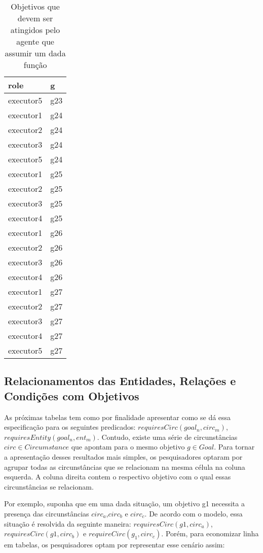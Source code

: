 \begin{table}[H]
\centering
{}
\begin{tabular}{|l|l|}
\hline
\textbf{role} & \textbf{g} \\ \hline
executor5 & g23 \\ \hline
executor1 & g24 \\ \hline
executor2 & g24 \\ \hline
executor3 & g24 \\ \hline
executor5 & g24 \\ \hline
executor1 & g25 \\ \hline
executor2 & g25 \\ \hline
executor3 & g25 \\ \hline
executor4 & g25 \\ \hline
executor1 & g26 \\ \hline
executor2 & g26 \\ \hline
executor3 & g26 \\ \hline
executor4 & g26 \\ \hline
executor1 & g27 \\ \hline
executor2 & g27 \\ \hline
executor3 & g27 \\ \hline
executor4 & g27 \\ \hline
executor5 & g27 \\ \hline
\end{tabular}
\caption{Objetivos que devem ser atingidos pelo agente que assumir um dada função}
\label{deontic4}
\end{table}

\subsection{Relacionamentos das Entidades, Relações e Condições com Objetivos}

As próximas tabelas tem como por finalidade apresentar como se dá essa especificação para os seguintes predicados: $requiresCirc(goal_n, circ_m)$,$requiresEntity(goal_n, ent_m)$. Contudo, existe uma série de circunstâncias $circ \in Circumstance$ que apontam para o mesmo objetivo $g \in Goal$. Para tornar a apresentação desses resultados mais simples, os pesquisadores optaram por agrupar todas as circunstâncias que se relacionam na mesma célula na coluna esquerda. A coluna direita contem o respectivo objetivo com o qual essas circunstâncias se relacionam.

Por exemplo, suponha que em uma dada situação, um objetivo g1 necessita a presença das circunstâncias $circ_a$,$circ_b$ e $circ_c$. De acordo com o modelo, essa situação é resolvida da seguinte maneira: $requiresCirc(g1,circ_a)$, $requiresCirc(g1,circ_b)$ e $requireCirc(g_1,circ_c)$. Porém, para economizar linha em tabelas, os pesquisadores optam por representar esse cenário assim:

